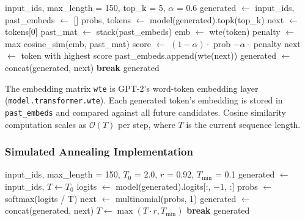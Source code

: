 \documentclass[12pt]{article}
\begin{document}
	\begin{algorithm}[H]
		\caption{Contrastive Search}
		\label{alg:contrastive}
		\begin{algorithmic}[1]
			\Require input\_ids, max\_length = 150, top\_k = 5, $\alpha$ = 0.6
			\State generated $\leftarrow$ input\_ids, past\_embeds $\leftarrow$ []
			\State probs, tokens $\leftarrow$ model(generated).topk(top\_k)
			\State next $\leftarrow$ tokens[0] 
			\Else
			\State past\_mat $\leftarrow$ stack(past\_embeds)
			\State emb $\leftarrow$ wte(token)
			\State penalty $\leftarrow$ max cosine\_sim(emb, past\_mat)
			\State score $\leftarrow$ $(1-\alpha) \cdot $ prob $- \alpha \cdot$ penalty
			\EndFor
			\State next $\leftarrow$ token with highest score
			\EndIf
			\State past\_embeds.append(wte(next))
			\State generated $\leftarrow$ concat(generated, next)
			 \textbf{break} \EndIf
			\EndWhile
			\Return generated
		\end{algorithmic}
	\end{algorithm}
	
	The embedding matrix \texttt{wte} is GPT-2's word-token embedding layer (\texttt{model.transformer.wte}). Each generated token's embedding is stored in \texttt{past\_embeds} and compared against all future candidates. Cosine similarity computation scales as $\mathcal{O}(T)$ per step, where $T$ is the current sequence length.
	
	\subsubsection{Simulated Annealing Implementation}
	
	\begin{algorithm}[H]
		\caption{Simulated Annealing Search}
		\label{alg:sa}
		\begin{algorithmic}[1]
			\Require input\_ids, max\_length = 150, $T_0$ = 2.0, $r$ = 0.92, $T_{\min}$ = 0.1
			\State generated $\leftarrow$ input\_ids, $T \leftarrow T_0$
			\State logits $\leftarrow$ model(generated).logits[:, $-1$, :]
			\State probs $\leftarrow$ softmax(logits / T)
			\State next $\leftarrow$ multinomial(probs, 1)
			\State generated $\leftarrow$ concat(generated, next)
			\State $T \leftarrow \max(T \cdot r, T_{\min})$ 
			 \textbf{break} \EndIf
			\EndWhile
			\Return generated
		\end{algorithmic}
	\end{algorithm}
	
\end{document}
